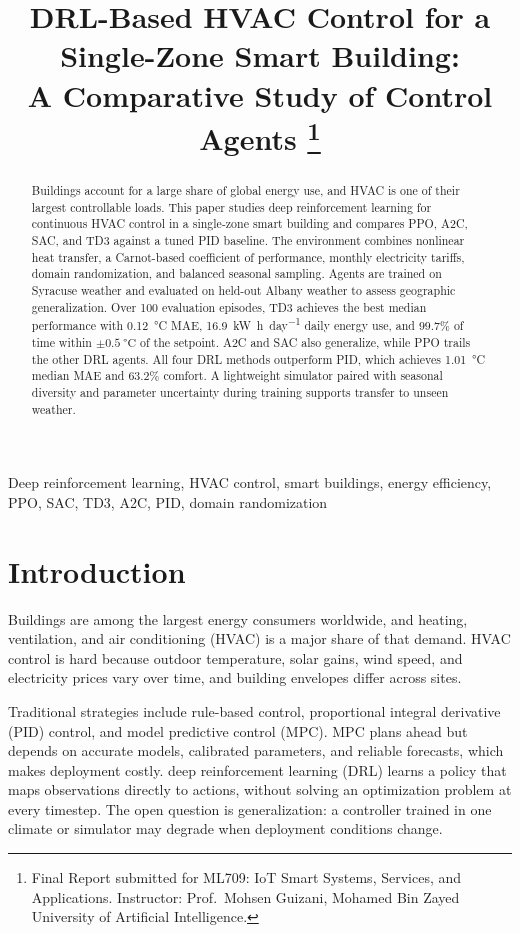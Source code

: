 \documentclass[conference]{IEEEtran}
\title{DRL-Based HVAC Control for a Single-Zone Smart Building:\\%
A Comparative Study of Control Agents%
\thanks{Final Report submitted for ML709: IoT Smart Systems, Services,
and Applications. Instructor: Prof.~Mohsen Guizani, Mohamed Bin Zayed
University of Artificial Intelligence.}}
\author{%
  \IEEEauthorblockN{%
    Saif Alkindi\IEEEauthorrefmark{1},~%
    Hamdan Alhadhrami\IEEEauthorrefmark{1},~%
    Khalfan Hableel\IEEEauthorrefmark{1}~and~%
    Ali Alharthi\IEEEauthorrefmark{1}%
  }
  \IEEEauthorblockA{%
    \IEEEauthorrefmark{1}Mohamed Bin Zayed University of Artificial Intelligence\\%
    Student IDs: 25011027,~25010875,~25011026,~22010335%
  }%
}
\newcommand{\acDRL}{deep reinforcement learning (DRL)}
\newcommand{\acHVAC}{heating, ventilation, and air conditioning (HVAC)}
\begin{document}
\maketitle

\begin{abstract}
Buildings account for a large share of global energy use, and HVAC is one of their largest controllable loads. This paper studies deep reinforcement learning for continuous HVAC control in a single-zone smart building and compares PPO, A2C, SAC, and TD3 against a tuned PID baseline. The environment combines nonlinear heat transfer, a Carnot-based coefficient of performance, monthly electricity tariffs, domain randomization, and balanced seasonal sampling. Agents are trained on Syracuse weather and evaluated on held-out Albany weather to assess geographic generalization. Over 100 evaluation episodes, TD3 achieves the best median performance with \SI{0.12}{\degreeCelsius} MAE, \SI{16.9}{\kilo\watt\hour\per day} daily energy use, and $99.7\%$ of time within $\pm\SI{0.5}{\degreeCelsius}$ of the setpoint. A2C and SAC also generalize, while PPO trails the other DRL agents. All four DRL methods outperform PID, which achieves \SI{1.01}{\degreeCelsius} median MAE and $63.2\%$ comfort. A lightweight simulator paired with seasonal diversity and parameter uncertainty during training supports transfer to unseen weather.
\end{abstract}

\begin{IEEEkeywords}
Deep reinforcement learning, HVAC control, smart buildings, energy efficiency,
PPO, SAC, TD3, A2C, PID, domain randomization
\end{IEEEkeywords}

\section{Introduction}
\label{sec:introduction}

Buildings are among the largest energy consumers worldwide, and \acHVAC{}
is a major share of that demand. HVAC control is hard because outdoor
temperature, solar gains, wind speed, and electricity prices vary over
time, and building envelopes differ across sites.

Traditional strategies include rule-based control, proportional integral
derivative (PID) control, and model predictive control (MPC). MPC plans
ahead but depends on accurate models, calibrated parameters, and reliable
forecasts, which makes deployment costly. \acDRL{} learns a policy that
maps observations directly to actions, without solving an optimization
problem at every timestep. The open question is generalization: a
controller trained in one climate or simulator may degrade when
deployment conditions change.
\end{document}
